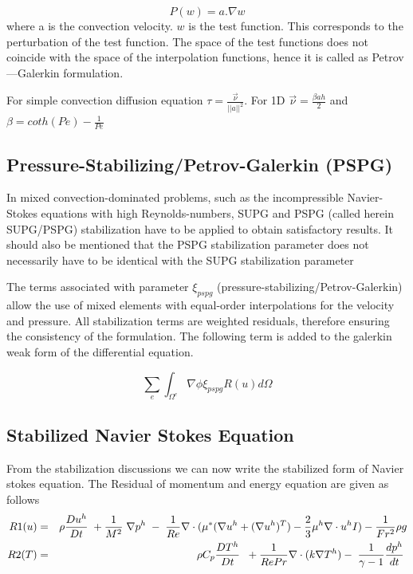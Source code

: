 $$P(w)= a.\nabla w$$  where a is the convection velocity. $w$ is the test function.  This corresponds to the perturbation of the test function. The space of the test functions does not coincide with the space of the interpolation functions, hence it is called as Petrov—Galerkin formulation.

 For simple convection diffusion equation
\bigskip
 $\tau = \frac{\overrightarrow{\nu}}{\vert \vert a \vert\vert^2}$. For 1D $\overrightarrow{\nu}=\frac{\beta a h}{2}$ and $\beta = coth(Pe)-\frac{1}{Pe}$
 
 \subsection{Pressure-Stabilizing/Petrov-Galerkin (PSPG)} 
 
 In mixed convection-dominated problems, such as the incompressible Navier-Stokes equations
 with high Reynolds-numbers, SUPG and PSPG (called herein SUPG/PSPG) stabilization have to
 be applied to obtain satisfactory results. It should also be mentioned that the PSPG stabilization parameter does not necessarily have to be identical with the SUPG stabilization parameter
 
 \bigskip
  The terms associated with parameter $\xi_{pspg}$ (pressure-stabilizing/Petrov-Galerkin)
 allow the use of mixed elements with equal-order interpolations for the velocity and
 pressure. All stabilization
 terms are weighted residuals, therefore ensuring the consistency of the formulation. The following term is added to the galerkin weak form of the differential equation. 
 
  $$\sum_e \int_{\Omega^e} \nabla \phi \xi_{pspg} R(u)  d\Omega$$ 
 
 \subsection{Stabilized Navier Stokes Equation} 
 From the stabilization discussions we can now write the stabilized form of Navier stokes equation. The Residual of momentum and energy equation are given as follows
\bigskip
\begin{eqnarray*}
R1(u) &=& \rho \frac{D u^h}{D t} \hspace{1mm} + \frac{1}{M^2}\hspace{1mm}\nabla p^h\hspace{1mm}-\hspace{1mm}\frac{1}{Re}\nabla \cdot (\mu^*(\nabla u^h +(\nabla u^h)^T) - \frac{2}{3}\mu^h \nabla \cdot u^h I) - \frac{1}{Fr^2}\rho g \\
R2(T) &=& \rho C_p \frac{D T^h}{D t} \hspace{1mm} \hspace{1mm} + \frac{1}{Re Pr}\nabla\cdot (k \nabla T^h) - \hspace{1mm} \frac{1}{\gamma -1} \frac{d p^h}{d t}\hspace{1mm}
\end{eqnarray*}

